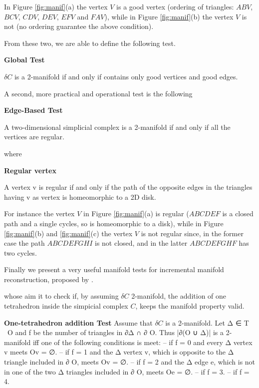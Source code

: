 In Figure \ref{fig:manif}(a) the vertex $V$  is a good vertex (ordering of triangles: $ABV$, $BCV$, $CDV$, $DEV$, $EFV$ and $FAV$), while in Figure \ref{fig:manif}(b) the vertex $V$ is not (no ordering guarantee the above condition).

From these two, we are able to define the following test.

\begin{thm}
  \textbf{Global Test} 
  
  $\delta C$ is a 2-manifold if and only if contains only good vertices and good edges.
\end{thm}



A second, more practical and operational test is the following


\begin{thm}
  \textbf{Edge-Based Test} 
  
   A two-dimensional simplicial complex is a 2-manifold if and only if all the vertices are regular.
\end{thm}

where

\begin{mydef}
  \textbf{Regular vertex} 
  
   A vertex v is regular  if and only if the path of the opposite edges in the triangles having v as vertex is homeomorphic to a 2D disk.
\end{mydef}


For instance the vertex $V$ in Figure \ref{fig:manif}(a) is regular ($ABCDEF$ is a closed path and a single cycles, so is homeomorphic to a disk), while in Figure \ref{fig:manif}(b) and \ref{fig:manif}(c) the vertex $V$ is not regular since, in the former case the path $ABCDEFGHI$ is not closed, and in the latter $ABCDEFGHF$ has two cycles.


Finally we present a very useful manifold tests for incremental manifold reconstruction, proposed by \cite{litvinov_lhuillier_13}.

whose aim it to check if, by assuming $\delta C$ 2-manifold, the addition of one tetrahedron inside the simpicial complex $C$, keeps the manifold property  valid.



\begin{thm}
  \textbf{One-tetrahedron addition Test} 
  Assume that $\delta C$ is a 2-manifold. Let Δ ∈ T \ O and f be the number of
triangles in ∂Δ ∩ ∂ O. Thus |∂(O ∪ {Δ})| is a 2-manifold iff
one of the following conditions is meet:
– if f = 0 and every Δ vertex v meets Ov = ∅.
– if f = 1 and the Δ vertex v, which is opposite to the Δ
triangle included in ∂ O, meets Ov = ∅.
– if f = 2 and the Δ edge e, which is not in one of the two
Δ triangles included in ∂ O, meets Oe = ∅.
– if f = 3.
– if f = 4.

\end{thm}



